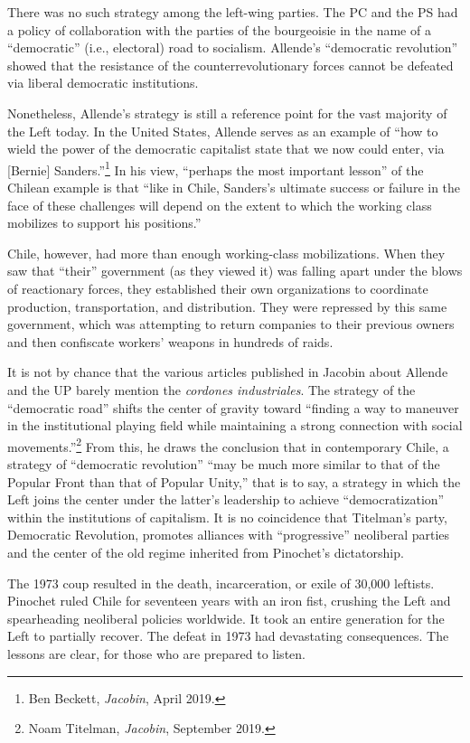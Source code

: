 There was no such strategy among the left-wing parties. The PC and the PS had a policy of collaboration with the parties of the bourgeoisie in the name of a ``democratic'' (i.e., electoral) road to socialism. Allende's ``democratic revolution'' showed that the resistance of the counterrevolutionary forces cannot be defeated via liberal democratic institutions.

Nonetheless, Allende's strategy is still a reference point for the vast majority of the Left today. In the United States, Allende serves as an example of ``how to wield the power of the democratic capitalist state that we now could enter, via [Bernie] Sanders.''\footnote{Ben Beckett, \emph{Jacobin}, April 2019.} In his view, ``perhaps the most important lesson'' of the Chilean example is that ``like in Chile, Sanders's ultimate success or failure in the face of these challenges will depend on the extent to which the working class mobilizes to support his positions.''

Chile, however, had more than enough working-class mobilizations. When they saw that ``their'' government (as they viewed it) was falling apart under the blows of reactionary forces, they established their own organizations to coordinate production, transportation, and distribution. They were repressed by this same government, which was attempting to return companies to their previous owners and then confiscate workers' weapons in hundreds of raids.

It is not by chance that the various articles published in Jacobin about Allende and the UP barely mention the \emph{cordones industriales}. The strategy of the ``democratic road'' shifts the center of gravity toward ``finding a way to maneuver in the institutional playing field while maintaining a strong connection with social movements.''\footnote{Noam Titelman, \emph{Jacobin}, September 2019.} From this, he draws the conclusion that in contemporary Chile, a strategy of ``democratic revolution'' ``may be much more similar to that of the Popular Front than that of Popular Unity,'' that is to say, a strategy in which the Left joins the center under the latter's leadership to achieve ``democratization'' within the institutions of capitalism. It is no coincidence that Titelman's party, Democratic Revolution, promotes alliances with ``progressive'' neoliberal parties and the center of the old regime inherited from Pinochet's dictatorship.

The 1973 coup resulted in the death, incarceration, or exile of 30,000 leftists. Pinochet ruled Chile for seventeen years with an iron fist, crushing the Left and spearheading neoliberal policies worldwide. It took an entire generation for the Left to partially recover. The defeat in 1973 had devastating consequences. The lessons are clear, for those who are prepared to listen.
